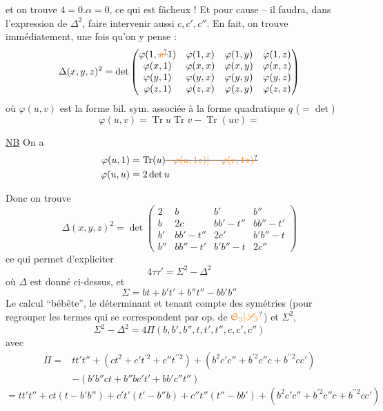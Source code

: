 et on trouve $4=0.\alpha=0$, ce qui est fâcheux ! Et pour cause -- il faudra, dans l'expression de $\Delta^2$, faire intervenir aussi $c,c',c''$. En fait, on trouve immédiatement, une fois qu'on y pense :
\[
 \Delta(x,y,z)^2=\det\begin{pmatrix}
 \varphi(1,\deleted{\unsure{x}}1)&\varphi(1,x)&\varphi(1,y)&\varphi(1,z)\\
 \varphi(x,1)&\varphi(x,x)&\varphi(x,y)&\varphi(x,z)\\
 \varphi(y,1)&\varphi(y,x)&\varphi(y,y)&\varphi(y,z)\\
 \varphi(z,1)&\varphi(z,x)&\varphi(z,y)&\varphi(z,z)
 \end{pmatrix}
\]
où $\varphi(u,v)$ est la forme bil. sym. associée à la forme quadratique $q$ ($=\det$)
\[
 \varphi(u,v)=\operatorname{Tr}u\operatorname{Tr}v-\operatorname{Tr}(uv)=
\]

\uline{NB} On a
\[
 \begin{aligned}
 \varphi(u,1)&=\operatorname{Tr}(u)\deleted{\unsure{-\varphi(u,1z)|-\varphi(v,1z)}}\\
 \varphi(u,u)&=2\det u
 \end{aligned}
\]

Donc on trouve
\[
 \boxed{\Delta(x,y,z)^2=\det\begin{pmatrix}
 2&b&b'&b''\\
 b&2c&bb'-t''&bb''-t'\\
 b'&bb'-t''&2c'&b'b''-t\\
 b''&bb''-t'&b'b''-t&2c''
 \end{pmatrix}}
\]
ce qui permet d'expliciter
\[
 4\tau\tau'=\Sigma^2-\Delta^2
\]
où $\Delta$ est donné ci-dessus, et
\[
 \boxed{\Sigma=bt+b't'+b''t''-bb'b''}
\]
Le calcul ``bébête'',  le déterminant et tenant compte des symétries (pour regrouper les termes qui se correspondent par  op. de $\unsure{\mathfrak S_3|\mathscr S_3}$) et $\Sigma^2$,
\[
 \Sigma^2-\Delta^2=4\Pi(b,b',b'',t,t',t'',c,c',c'')
\]
avec
\[
\boxed{\begin{aligned}
 \Pi={}&tt't''+(ct^2+c't^{\prime 2}+c''t^{\prime\prime 2})+(b^2c'c''+b^{\prime 2}c''c+b^{\prime\prime 2}cc')\\
 &-(b'b''ct+b''bc't'+bb'c''t'')
\end{aligned}}
\]
\[
 =tt't''+ct(t-b'b'')+c't'(t'-b''b)+c''t''(t''-bb')+(b^2c'c''+b^{\prime 2}c''c+b^{\prime\prime 2}cc')
\]

